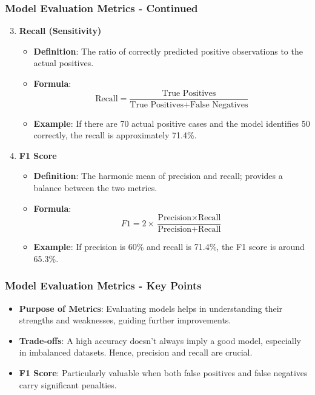 \documentclass[aspectratio=169]{beamer}
\begin{document}
\begin{frame}[fragile]
    \frametitle{Model Evaluation Metrics - Continued}
    \begin{enumerate}
        \setcounter{enumi}{2} %
        \item \textbf{Recall (Sensitivity)}
            \begin{itemize}
                \item \textbf{Definition}: The ratio of correctly predicted positive observations to the actual positives.
                \item \textbf{Formula}:
                \[
                \text{Recall} = \frac{\text{True Positives}}{\text{True Positives} + \text{False Negatives}}
                \]
                \item \textbf{Example}: If there are 70 actual positive cases and the model identifies 50 correctly, the recall is approximately 71.4\%.
            \end{itemize}
        
        \item \textbf{F1 Score}
            \begin{itemize}
                \item \textbf{Definition}: The harmonic mean of precision and recall; provides a balance between the two metrics.
                \item \textbf{Formula}:
                \[
                F1 = 2 \times \frac{\text{Precision} \times \text{Recall}}{\text{Precision} + \text{Recall}}
                \]
                \item \textbf{Example}: If precision is 60\% and recall is 71.4\%, the F1 score is around 65.3\%.
            \end{itemize}
    \end{enumerate}
\end{frame}

\begin{frame}[fragile]
    \frametitle{Model Evaluation Metrics - Key Points}
    \begin{itemize}
        \item \textbf{Purpose of Metrics}: Evaluating models helps in understanding their strengths and weaknesses, guiding further improvements.
        \item \textbf{Trade-offs}: A high accuracy doesn't always imply a good model, especially in imbalanced datasets. Hence, precision and recall are crucial.
        \item \textbf{F1 Score}: Particularly valuable when both false positives and false negatives carry significant penalties.
    \end{itemize}
\end{frame}
\end{document}
